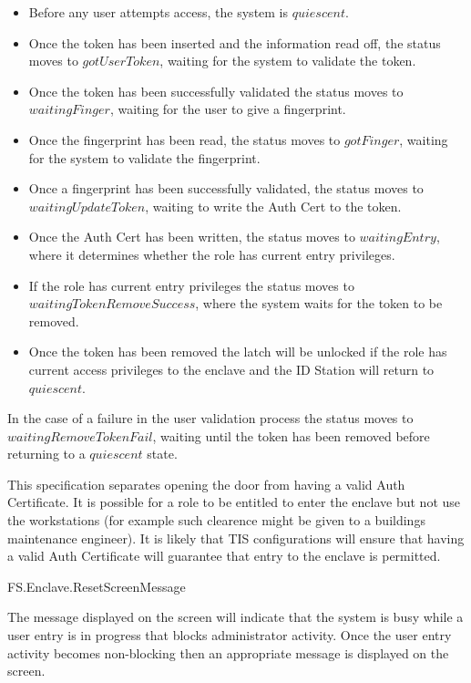 \begin{itemize}
\item
Before any user attempts access, the system is $quiescent$.
\item
Once the token has been inserted and the information read off,
the status moves to $gotUserToken$, waiting for the system to validate
the token. 
\item
Once the token has been successfully validated the 
status moves to $waitingFinger$,
waiting for the user to give a fingerprint.
\item
Once the fingerprint has been read, the status moves to $gotFinger$,
waiting for the system to validate the fingerprint.
\item
Once a fingerprint has been successfully validated,
the status moves to $waitingUpdateToken$,
waiting to write the Auth Cert to the token.
\item
Once the Auth Cert has been written, the status moves to
$waitingEntry$, where it determines whether the role has
current entry privileges.
\item
If the role has current entry privileges the status moves to
$waitingTokenRemoveSuccess$, where the system waits for 
the token to be removed.
\item
Once the token has been removed
the latch will be unlocked if the role has current access privileges
to the enclave and the ID Station will return to $quiescent$.
\end{itemize}
In the case of a failure in the user validation process the status
moves to  $waitingRemoveTokenFail$, waiting until the token has been removed before returning to a
$quiescent$ state.

This specification separates opening the door from having a valid Auth
Certificate. It is possible for a role to be entitled to enter the
enclave but not use the workstations (for example such clearence might
be given to a buildings maintenance engineer). It is likely that TIS
configurations will ensure that having a valid Auth Certificate will
guarantee that entry to the enclave is permitted. 

\begin{traceunit}{FS.Enclave.ResetScreenMessage}
\end{traceunit}
The message displayed on the screen will indicate that the
system is busy while a user entry is in progress that blocks
administrator activity. Once the user entry activity becomes
non-blocking then an appropriate message is displayed on the screen.

